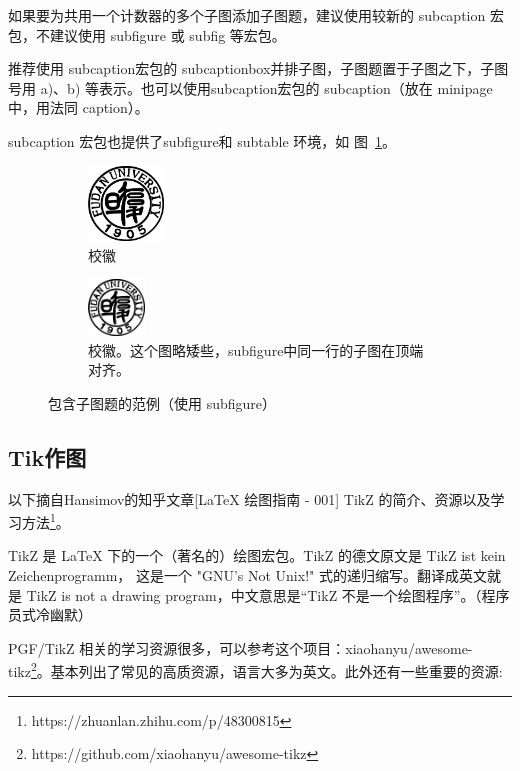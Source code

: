 如果要为共用一个计数器的多个子图添加子图题，建议使用较新的 subcaption 宏包，不建议使用 subfigure 或 subfig 等宏包。

推荐使用 subcaption宏包的 subcaptionbox并排子图，子图题置于子图之下，子图号用 a)、b) 等表示。也可以使用subcaption宏包的 subcaption（放在 minipage中，用法同 caption）。

subcaption 宏包也提供了subfigure和 subtable 环境，如
图~\ref{fig:subfigure}。

\begin{figure}[!htp]
  \centering
  \begin{subfigure}{0.3\textwidth}
    \centering
    \includegraphics[height=2cm]{./figs/fudan-emblem.pdf}
    \caption{校徽}
  \end{subfigure}
  \hspace{1cm}
  \begin{subfigure}{0.4\textwidth}
    \centering
    \includegraphics[height=1.5cm]{./figs/fudan-emblem.pdf}
    \caption{校徽。这个图略矮些，subfigure中同一行的子图在顶端对齐。}
  \end{subfigure}
  \caption{包含子图题的范例（使用 subfigure）}
  \label{fig:subfigure}
\end{figure}

\subsection{Tik作图}
以下摘自Hansimov的知乎文章[LaTeX 绘图指南 - 001] TikZ 的简介、资源以及学习方法\footnote{https://zhuanlan.zhihu.com/p/48300815}。

TikZ 是 LaTeX 下的一个（著名的）绘图宏包。TikZ 的德文原文是 TikZ ist kein Zeichenprogramm， 这是一个 "GNU's Not Unix!" 式的递归缩写。翻译成英文就是 TikZ is not a drawing program，中文意思是“TikZ 不是一个绘图程序”。（程序员式冷幽默）

PGF/TikZ 相关的学习资源很多，可以参考这个项目：xiaohanyu/awesome-tikz\footnote{https://github.com/xiaohanyu/awesome-tikz}。基本列出了常见的高质资源，语言大多为英文。此外还有一些重要的资源:

